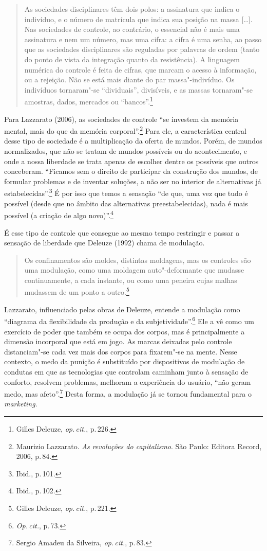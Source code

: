 \begin{quote}
As sociedades disciplinares têm dois polos: a assinatura que indica o
indivíduo, e o número de matrícula que indica sua posição na massa
{[}\ldots{}{]}. Nas sociedades de controle, ao contrário, o essencial não é mais
uma assinatura e nem um número, mas uma cifra: a cifra é uma senha, ao
passo que as sociedades disciplinares são reguladas por palavras de
ordem (tanto do ponto de vista da integração quanto da resistência). A
linguagem numérica do controle é feita de cifras, que marcam o acesso à
informação, ou a rejeição. Não se está mais diante do par
massa"-indivíduo. Os indivíduos tornaram"-se ``dividuais'', divisíveis, e
as massas tornaram"-se amostras, dados, mercados ou ``bancos''.\footnote{Gilles Deleuze, \textit{op.\,cit.}, p.\,226.}
\end{quote}

Para Lazzarato (2006), as sociedades de controle ``se investem da memória mental, mais do que
da memória corporal''.\footnote{Maurizio Lazzarato. \emph{As revoluções do capitalismo}. São Paulo: Editora
Record, 2006, p.\,84.} Para ele, a característica central desse
tipo de sociedade é a multiplicação da oferta de mundos. Porém, de
mundos normalizados, que não se tratam de mundos possíveis ou do
acontecimento, e onde a nossa liberdade se trata apenas de escolher
dentre os possíveis que outros conceberam. ``Ficamos sem o direito de
participar da construção dos mundos, de formular problemas e de inventar
soluções, a não ser no interior de alternativas já estabelecidas''.\footnote{Ibid., p.\,101.}
É por isso que temos a sensação ``de que, uma vez que tudo é possível
(desde que no âmbito das alternativas preestabelecidas), nada é mais
possível (a criação de algo novo)''.\footnote{Ibid., p.\,102.}

É esse tipo de controle que consegue ao mesmo tempo restringir e passar
a sensação de liberdade que Deleuze (1992) chama de modulação.

\begin{quote}
Os confinamentos são moldes, distintas moldagens, mas os controles são
uma modulação, como uma moldagem auto"-deformante que mudasse
continuamente, a cada instante, ou como uma peneira cujas malhas
mudassem de um ponto a outro.\footnote{Gilles Deleuze, \textit{op.\,cit.}, p.\,221.}
\end{quote}

Lazzarato, influenciado pelas obras de Deleuze, entende a
modulação como ``diagrama da flexibilidade da produção e da
subjetividade''.\footnote{\textit{Op.\,cit.}, p.\,73.} Ele a vê como um exercício de poder que também se
ocupa dos corpos, mas é principalmente a dimensão incorporal que está em
jogo. As marcas deixadas pelo controle distanciam"-se cada vez mais dos
corpos para fixarem"-se na mente. Nesse contexto, o medo da punição é
substituído por dispositivos de modulação de condutas em que as
tecnologias que controlam caminham junto à sensação de conforto,
resolvem problemas, melhoram a experiência do usuário, ``não geram medo,
mas afeto''.\footnote{Sergio Amadeu da Silveira, \textit{op.\,cit.}, p.\,83.} Desta forma, a modulação já se tornou fundamental para o \emph{marketing}.

